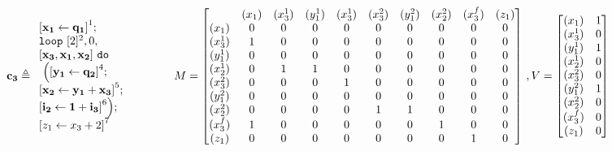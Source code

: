 \documentclass[a4paper,11pt]{article}
\begin{document}
\[\ssa{c_3} \triangleq
\begin{array}{l}
     \left[\ssa{ x_1 \leftarrow q_1}  \right]^1 ; \\
    \eloop ~ [2]^{2} , 0,\\
  \ssa{[x_3 , x_1 , x_2]} 
     ~ \edo
    \\
    ~ \Big( 
    \left[\ssa{ y_1 \leftarrow q_2} \right]^4; \\
    \left[\ssa{x_2 \leftarrow y_1  + x_3 } \right]^5; \\
    \left[\ssa{i_2 \leftarrow 1  + i_3 } \right]^6
    \Big) ; \\
     \left[ \assign{z_1}{x_3 + 2}  \right]^{7}
\end{array}
~~~~~~~~~~~~
M =  \left[ \begin{matrix}
 & (x_1) & (x_3^{1}) & (y_1^{1}) & (x_3^{1})  & (x_3^{2}) & (y_1^{2}) & (x_2^{2}) & (x_3^{f}) &  (z_1) \\
(x_1) & 0 & 0 & 0 & 0 & 0 & 0 & 0 &0 &0 \\
(x_3^{1}) & 1 & 0 & 0 & 0 & 0 & 0 & 0&0&0\\
(y_1^{1}) & 0 & 0 & 0 & 0 & 0 & 0& 0& 0 &0\\
(x_2^{1}) & 0 & 1 & 1 & 0 & 0 & 0 & 0& 0&0\\
(x_3^{2}) & 0 & 0 & 0 & 1 & 0 & 0 & 0 & 0&0 \\
(y_1^{2}) & 0 & 0 & 0 & 0 & 0 & 0 & 0& 0&0\\
(x_2^{2}) & 0 & 0 & 0 & 0 & 1 & 1 & 0& 0&0\\
(x_3^{f}) & 1 & 0 & 0 & 0 & 0 & 0 & 1& 0&0\\
(z_1) & 0 & 0 & 0 & 0 & 0 & 0 & 0 & 1 &0 \\
\end{matrix} \right] ~ , V = \left [ \begin{matrix}
(x_1) &  1 \\
(x_3^{1}) & 0 \\
(y_1^{1}) & 1 \\
(x_2^{1}) & 0 \\
(x_3^{2}) & 0 \\
(y_1^{2}) & 1 \\
(x_2^{2}) & 0 \\
(x_3^{f}) & 0 \\
(z_1) &  0 \\
\end{matrix} \right ]
\]
%
\end{document}
